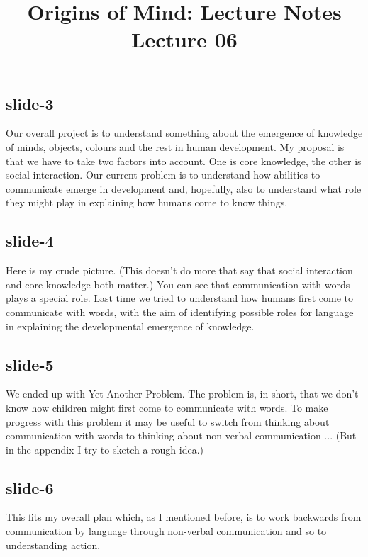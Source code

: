 \documentclass[12pt,\papersize]{extarticle}
\begin{document}
\setlength\footnotesep{1em}







\title {Origins of Mind: Lecture Notes \\ Lecture 06}
 
\maketitle
 
 
\subsection{slide-3}
Our overall project is to understand something about the emergence of knowledge of minds, objects, colours and the rest in human development.
My proposal is that we have to take two factors into account. One is core knowledge, the other is social interaction.
Our current problem is to understand how abilities to communicate emerge in development and, hopefully, also to understand what role they might play in explaining how humans come to know things.
 
 
\subsection{slide-4}
Here is my crude picture. (This doesn't do more that say that social interaction and core knowledge both matter.) You can see that communication with words plays a special role. Last time we tried to understand how humans first come to communicate with words, with the aim of identifying possible roles for language in explaining the developmental emergence of knowledge.
 
 
\subsection{slide-5}
We ended up with Yet Another Problem. The problem is, in short, that we don't know how children might first come to communicate with words.
To make progress with this problem it may be useful to switch from thinking about communication with words to thinking about non-verbal communication ... (But in the appendix I try to sketch a rough idea.)
 
 
\subsection{slide-6}
This fits my overall plan which, as I mentioned before, is to work backwards from communication by language through non-verbal communication and so to understanding action.
 
\end{document}
